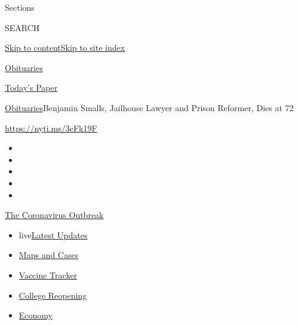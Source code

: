 Sections

SEARCH

\protect\hyperlink{site-content}{Skip to
content}\protect\hyperlink{site-index}{Skip to site index}

\href{https://www.nytimes.com/section/obituaries}{Obituaries}

\href{https://myaccount.nytimes.com/auth/login?response_type=cookie\&client_id=vi}{}

\href{https://www.nytimes.com/section/todayspaper}{Today's Paper}

\href{/section/obituaries}{Obituaries}\textbar{}Benjamin Smalls,
Jailhouse Lawyer and Prison Reformer, Dies at 72

\url{https://nyti.ms/3eFk19F}

\begin{itemize}
\item
\item
\item
\item
\item
\end{itemize}

\href{https://www.nytimes.com/news-event/coronavirus?action=click\&pgtype=Article\&state=default\&region=TOP_BANNER\&context=storylines_menu}{The
Coronavirus Outbreak}

\begin{itemize}
\tightlist
\item
  live\href{https://www.nytimes.com/2020/08/03/world/coronavirus-covid-19.html?action=click\&pgtype=Article\&state=default\&region=TOP_BANNER\&context=storylines_menu}{Latest
  Updates}
\item
  \href{https://www.nytimes.com/interactive/2020/us/coronavirus-us-cases.html?action=click\&pgtype=Article\&state=default\&region=TOP_BANNER\&context=storylines_menu}{Maps
  and Cases}
\item
  \href{https://www.nytimes.com/interactive/2020/science/coronavirus-vaccine-tracker.html?action=click\&pgtype=Article\&state=default\&region=TOP_BANNER\&context=storylines_menu}{Vaccine
  Tracker}
\item
  \href{https://www.nytimes.com/2020/08/02/us/covid-college-reopening.html?action=click\&pgtype=Article\&state=default\&region=TOP_BANNER\&context=storylines_menu}{College
  Reopening}
\item
  \href{https://www.nytimes.com/live/2020/08/03/business/stock-market-today-coronavirus?action=click\&pgtype=Article\&state=default\&region=TOP_BANNER\&context=storylines_menu}{Economy}
\end{itemize}

